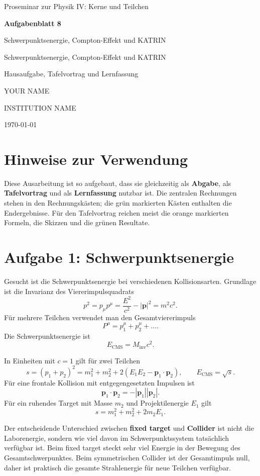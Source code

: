 \documentclass[11pt,a4paper]{scrartcl}
\newcommand{\CourseTitle}{Proseminar zur Physik IV: Kerne und Teilchen}
\newcommand{\DocumentKind}{Hausaufgabe, Tafelvortrag und Lernfassung}
\newcommand{\DocumentTitle}{Aufgabenblatt 8}
\newcommand{\DocumentSubtitle}{Schwerpunktsenergie, Compton-Effekt und KATRIN}
\newcommand{\AuthorName}{YOUR NAME}
\newcommand{\InstitutionName}{INSTITUTION NAME}
\newcommand{\SubmissionDate}{\today}
\newcommand{\makeuniversitytitle}{%
    \begin{titlepage}
        \centering
        \vspace*{2cm}
        {\Large \CourseTitle\par}
        \vspace{1.2cm}
        {\huge\bfseries \DocumentTitle\par}
        \ifx\DocumentSubtitle\empty\else
            \vspace{0.4cm}
            {\Large \DocumentSubtitle\par}
        \fi
        \vspace{1cm}
        {\Large \DocumentKind\par}
        \vfill
        {\large \AuthorName\par}
        \vspace{0.2cm}
        {\large \InstitutionName\par}
        \vspace{0.8cm}
        {\large \SubmissionDate\par}
    \end{titlepage}
    \pagenumbering{arabic}
}
\newcommand{\abs}[1]{\left| #1 \right|}
\newcommand{\paren}[1]{\left( #1 \right)}
\newcommand{\vect}[1]{\bm{#1}}
\newcommand{\Ecm}{E_{\mathrm{CMS}}}
\theoremstyle{definition}
\theoremstyle{plain}
\theoremstyle{remark}
\begin{document}
\makeuniversitytitle
\tableofcontents
\newpage

\section*{Hinweise zur Verwendung}
\begin{summarybox}
Diese Ausarbeitung ist so aufgebaut, dass sie gleichzeitig als \textbf{Abgabe}, als \textbf{Tafelvortrag} und als \textbf{Lernfassung} nutzbar ist. Die zentralen Rechnungen stehen in den Rechnungskästen; die grün markierten Kästen enthalten die Endergebnisse. Für den Tafelvortrag reichen meist die orange markierten Formeln, die Skizzen und die grünen Resultate.
\end{summarybox}

\section{Aufgabe 1: Schwerpunktsenergie}

\begin{taskbox}
Gesucht ist die Schwerpunktsenergie bei verschiedenen Kollisionsarten. Grundlage ist die Invarianz des Viererimpulsquadrats
\[
    p^2 = p_\mu p^\mu = \frac{E^2}{c^2}-\abs{\vect p}^{2}=m^2c^2.
\]
Für mehrere Teilchen verwendet man den Gesamtviererimpuls
\[
    P^\mu = p_1^\mu+p_2^\mu+\dots.
\]
Die Schwerpunktsenergie ist
\[
    \Ecm = M_{\mathrm{inv}}c^2.
\]
\end{taskbox}

\begin{formulabox}[title=Zentrale Formel]
In Einheiten mit $c=1$ gilt für zwei Teilchen
\[
    s = \paren{p_1+p_2}^2
      = m_1^2+m_2^2+2\paren{E_1E_2-\vect p_1\cdot\vect p_2},
    \qquad
    \Ecm=\sqrt{s}.
\]
Für eine frontale Kollision mit entgegengesetzten Impulsen ist
\[
    \vect p_1\cdot\vect p_2=-\abs{\vect p_1}\abs{\vect p_2}.
\]
Für ein ruhendes Target mit Masse $m_2$ und Projektilenergie $E_1$ gilt
\[
    s=m_1^2+m_2^2+2m_2E_1.
\]
\end{formulabox}

\begin{learnbox}
Der entscheidende Unterschied zwischen \textbf{fixed target} und \textbf{Collider} ist nicht die Laborenergie, sondern wie viel davon im Schwerpunktssystem tatsächlich verfügbar ist. Beim fixed target steckt sehr viel Energie in der Bewegung des Gesamtschwerpunktes. Beim symmetrischen Collider ist der Gesamtimpuls null, daher ist praktisch die gesamte Strahlenergie für neue Teilchen verfügbar.
\end{learnbox}
\end{document}
